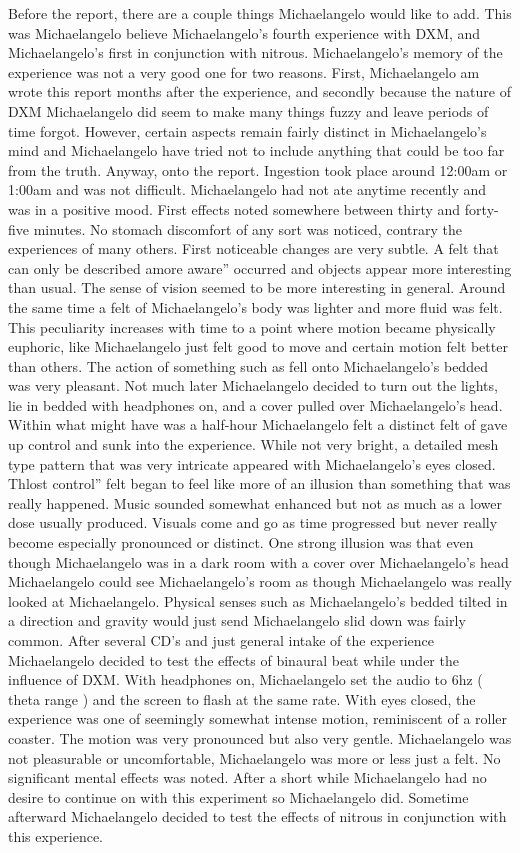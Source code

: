 \documentclass[12pt]{book}
\begin{document}
Before the report, there are a couple things Michaelangelo would like to add. This was Michaelangelo believe Michaelangelo's fourth experience with DXM, and Michaelangelo's first in conjunction with nitrous. Michaelangelo's memory of the experience was not a very good one for two reasons. First, Michaelangelo am wrote this report months after the experience, and secondly because the nature of DXM Michaelangelo did seem to make many things fuzzy and leave periods of time forgot. However, certain aspects remain fairly distinct in Michaelangelo's mind and Michaelangelo have tried not to include anything that could be too far from the truth. Anyway, onto the report. Ingestion took place around 12:00am or 1:00am and was not difficult. Michaelangelo had not ate anytime recently and was in a positive mood. First effects noted somewhere between thirty and forty-five minutes. No stomach discomfort of any sort was noticed, contrary the experiences of many others. First noticeable changes are very subtle. A felt that can only be described amore aware'' occurred and objects appear more interesting than usual. The sense of vision seemed to be more interesting in general. Around the same time a felt of Michaelangelo's body was lighter and more fluid was felt. This peculiarity increases with time to a point where motion became physically euphoric, like Michaelangelo just felt good to move and certain motion felt better than others. The action of something such as fell onto Michaelangelo's bedded was very pleasant. Not much later Michaelangelo decided to turn out the lights, lie in bedded with headphones on, and a cover pulled over Michaelangelo's head. Within what might have was a half-hour Michaelangelo felt a distinct felt of gave up control and sunk into the experience. While not very bright, a detailed mesh type pattern that was very intricate appeared with Michaelangelo's eyes closed. Thlost control'' felt began to feel like more of an illusion than something that was really happened. Music sounded somewhat enhanced but not as much as a lower dose usually produced. Visuals come and go as time progressed but never really become especially pronounced or distinct. One strong illusion was that even though Michaelangelo was in a dark room with a cover over Michaelangelo's head Michaelangelo could see Michaelangelo's room as though Michaelangelo was really looked at Michaelangelo. Physical senses such as Michaelangelo's bedded tilted in a direction and gravity would just send Michaelangelo slid down was fairly common. After several CD's and just general intake of the experience Michaelangelo decided to test the effects of binaural beat while under the influence of DXM. With headphones on, Michaelangelo set the audio to 6hz ( theta range ) and the screen to flash at the same rate. With eyes closed, the experience was one of seemingly somewhat intense motion, reminiscent of a roller coaster. The motion was very pronounced but also very gentle. Michaelangelo was not pleasurable or uncomfortable, Michaelangelo was more or less just a felt. No significant mental effects was noted. After a short while Michaelangelo had no desire to continue on with this experiment so Michaelangelo did. Sometime afterward Michaelangelo decided to test the effects of nitrous in conjunction with this experience. 
\end{document}
